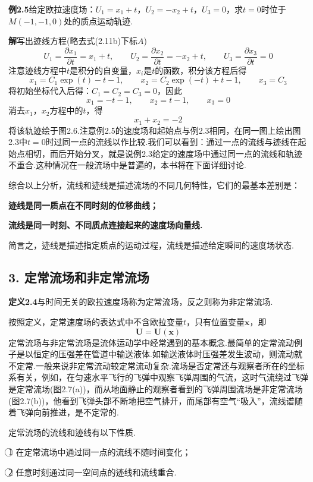 \noindent\textbf{例2.5}\quad 给定欧拉速度场：$U_1=x_1+t$，$U_2=-x_2+t$，$U_3=0$，求$t=0$时位于$M(-1,-1,0)$处的质点运动轨迹.

\noindent\textbf{解}\quad 写出迹线方程(略去式(2.11b)下标$A$)
\[
U_1=\frac{\partial x_1}{\partial t}=x_1+t,\qquad U_2=\frac{\partial x_2}{\partial t}=-x_2+t,\qquad U_3=\frac{\partial x_3}{\partial t}=0
\]
注意迹线方程中$t$是积分的自变量，$x_i$是$t$的函数，积分该方程后得
\[
x_1=C_1\exp(t)-t-1,\qquad x_2=C_2\exp(-t)+t-1,\qquad x_3=C_3
\]
将初始坐标代入后得：$C_1=C_2=C_3=0$，因此
\[
x_1=-t-1,\qquad x_2=t-1,\qquad x_3=0
\]
消去$x_1$，$x_2$方程中的$t$，得
\[
x_1+x_2=-2
\]
将该轨迹绘于图2.6.注意例2.5的速度场和起始点与例2.3相同，在同一图上绘出图2.3中$t=0$时过同一点的流线以作比较.我们可以看到：通过一点的流线与迹线在起始点相切，而后开始分叉，就是说例2.3给定的速度场中通过同一点的流线和轨迹不重合.这种情况在一般流场中是普遍的，本书将在下面详细讨论.

综合以上分析，流线和迹线是描述流场的不同几何特性，它们的最基本差别是：

\textbf{迹线是同一质点在不同时刻的位移曲线；}

\textbf{流线是同一时刻、不同质点连接起来的速度场向量线.}

简言之，迹线是描述指定质点的运动过程，流线是描述给定瞬间的速度场状态.

\subsection*{3. 定常流场和非定常流场}

\noindent\textbf{定义2.4}\quad 与时间无关的欧拉速度场称为定常流场，反之则称为非定常流场.

按照定义，定常速度场的表达式中不含欧拉变量$t$，只有位置变量$\boldsymbol{x}$，即
\[
\boldsymbol{U}=\boldsymbol{U}(\boldsymbol{x})
\]
定常流场与非定常流场是流体运动学中经常遇到的基本概念.最简单的定常流动例子是以恒定的压强差在管道中输送液体.如输送液体时压强差发生波动，则流动就不定常.一般来说非定常流动较定常流动复杂.流场是否定常还与观察者所在的坐标系有关，例如，在匀速水平飞行的飞弹中观察飞弹周围的气流，这时气流绕过飞弹是定常流场(图2.7(a))，而从地面静止的观察者看到的飞弹周围流场是非定常流场(图2.7(b))，他看到飞弹头部不断地把空气排开，而尾部有空气“吸入”，流线谱随着飞弹向前推进，是不定常的.

定常流场的流线和迹线有以下性质.

\textcircled{1} 在定常流场中通过同一点的流线不随时间变化；

\textcircled{2} 任意时刻通过同一空间点的迹线和流线重合.


